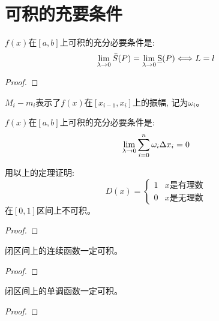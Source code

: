 
\section{可积的充要条件}
\begin{theorem}[可积的充要条件]
    $f(x)$在$[a, b]$上可积的充分必要条件是:
    \begin{equation*}
        \lim_{\lambda \to 0 } \bar{S}(P) = \lim_{\lambda \to 0 } \underbar{S}(P) \Longleftrightarrow L = l
    \end{equation*}
\end{theorem}
\begin{proof}

\end{proof}

$M_i-m_i$表示了$f(x)$在$[x_{i-1}, x_i]$上的振幅, 记为$\omega_i$。
\begin{theorem}
    $f(x)$在$[a, b]$上可积的充分必要条件是:
    \begin{equation*}
        \lim_{\lambda \to 0 } \sum_{i=0}^n\omega_i\Delta x_i = 0
    \end{equation*}
\end{theorem}

\begin{example}[Dirichlet函数]
    用以上的定理证明:
    \begin{equation*}
        D(x) = 
        \begin{cases}
            1 & x\text{是有理数} \\
            0 & x\text{是无理数}
        \end{cases}
    \end{equation*}
    在$[0, 1]$区间上不可积。
\end{example}
\begin{proof}
    
\end{proof}

\begin{lemma}
    闭区间上的连续函数一定可积。
\end{lemma}
\begin{proof}
    
\end{proof}

\begin{lemma}
    闭区间上的单调函数一定可积。
\end{lemma}
\begin{proof}
    
\end{proof}

